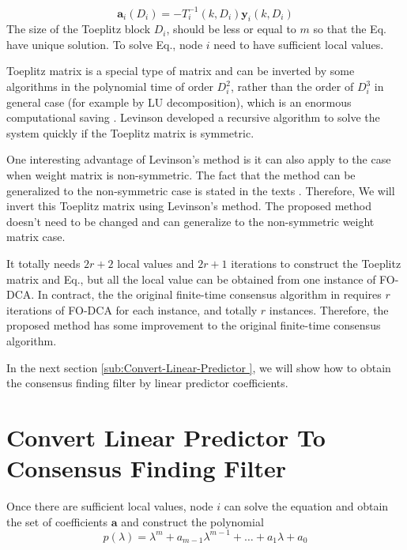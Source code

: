 \begin{equation}
\mathbf{a}_{i}\left(D_{i}\right)=-T_{i}^{-1}\left(k,D_{i}\right)\mathbf{y}_{i}\left(k,D_{i}\right)\label{eq:Toeplitz Eq.-2}
\end{equation}
The size of the Toeplitz block $D_{i}$, should be less or equal to
$m$ so that the Eq. have unique solution.
To solve Eq., node $i$ need to have sufficient
local values.

Toeplitz matrix is a special type of matrix and can be inverted by
some algorithms in the polynomial time of order $D_{i}^{2}$, rather
than the order of $D_{i}^{3}$ in general case (for example by LU
decomposition), which is an enormous computational saving \cite{Prass2007}.
Levinson developed a recursive algorithm to solve the system quickly
if the Toeplitz matrix is symmetric. 

One interesting advantage of Levinson's method is it can also apply
to the case when weight matrix is non-symmetric. The fact that the
method can be generalized to the non-symmetric case is stated in the
texts \cite{Robinson2000}.  Therefore, We will invert this Toeplitz
matrix using Levinson's method. The proposed method  doesn't need
to be changed and can generalize to the non-symmetric weight matrix
case. 

It totally needs $2r+2$ local values and $2r+1$ iterations to construct
the Toeplitz matrix and Eq., but all the local
value can be obtained from one instance of FO-DCA. In contract, the
the original finite-time consensus algorithm in \cite{Sundaram2007}
requires $r$ iterations of FO-DCA for each instance, and totally
$r$ instances. Therefore, the proposed method has some improvement
to the original finite-time consensus algorithm. 

In the next section \ref{sub:Convert-Linear-Predictor }, we will
show how to obtain the consensus finding filter by linear predictor
coefficients.


\section{\label{sub:Convert-Linear-Predictor }Convert Linear Predictor To
Consensus Finding Filter}

Once there are sufficient local values, node $i$ can solve the equation
and obtain the set of coefficients \textbf{$\mathbf{a}$} and construct
the polynomial 
\[
p(\lambda)=\lambda^{m}+a_{m-1}\lambda^{m-1}+\ldots+a_{1}\lambda+a_{0}
\]


